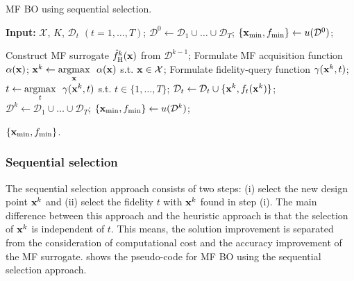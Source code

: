 \documentclass[iicol,sn-basic]{sn-jnl}%
\begin{document}
\begin{algorithm}
	\caption{MF BO using sequential selection.}\label{Algo5}
	\begin{algorithmic}[1]
		\State \textbf{Input:} $\mathcal{X}$, $K$, $\mathcal{D}_t$ $(t=1,\dots,T)$;
		\State $\mathcal{D}^0 \gets \mathcal{D}_1 \cup \dots \cup \mathcal{D}_T$;
		\State $\{{\bf x}_{\min},f_{\min}\} \gets u(\mathcal{D}^0)$;
		
		\State Construct MF surrogate $\hat{f}_\text{H}^k({\bf x})$ from $\mathcal{D}^{k-1}$;
		\State Formulate MF acquisition function $\alpha({\bf x})$;
		\State ${\bf x}^{k} \gets \underset{{\bf x}}{\mathrm{argmax}} \ \ \alpha({\bf x})$ s.t. ${\bf x} \in \mathcal{X}$; \label{Algo5:7}
		\State Formulate fidelity-query function $\gamma({\bf x}^{k},t)$; \label{Algo5:8}
		\State $t \gets \underset{t}{\mathrm{argmax}} \ \ \gamma({\bf x}^{k},t)$ s.t. $t \in \{1,\dots,T\}$; \label{Algo5:9}
		\State $\mathcal{D}_t \gets \mathcal{D}_t \cup \{{\bf x}^{k},f_t({\bf x}^{k})\}$; \label{Algo5:10}
		\State $\mathcal{D}^k \gets \mathcal{D}_1 \cup \dots \cup \mathcal{D}_T$;
		\State $\{{\bf x}_{\min},f_{\min}\} \gets u(\mathcal{D}^k)$;
		\EndFor
		
		\State \Return $\{{\bf x}_{\min},f_{\min}\}$.
	\end{algorithmic}
\end{algorithm}

\subsubsection{Sequential selection}\label{Sec523}

The sequential selection approach consists of two steps: (i) select the new design point ${\bf x}^k$ and (ii) select the fidelity $t$ with ${\bf x}^k$ found in step (i).
The main difference between this approach and the heuristic approach is that the selection of ${\bf x}^k$ is independent of $t$.
This means, the solution improvement is separated from the consideration of computational cost and the accuracy improvement of the MF surrogate.
 shows the pseudo-code for MF BO using the sequential selection approach.
\end{document}

